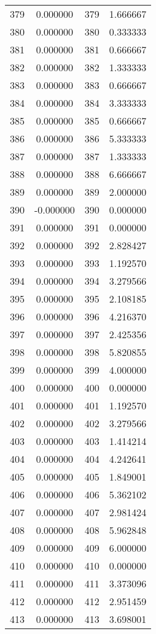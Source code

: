 \documentclass[12pt]{article}
\begin{document}
\begin{longtable}{@{}cccc@{}}
379 & 0.000000 & 379 & 1.666667 \\
380 & 0.000000 & 380 & 0.333333 \\
381 & 0.000000 & 381 & 0.666667 \\
382 & 0.000000 & 382 & 1.333333 \\
383 & 0.000000 & 383 & 0.666667 \\
384 & 0.000000 & 384 & 3.333333 \\
385 & 0.000000 & 385 & 0.666667 \\
386 & 0.000000 & 386 & 5.333333 \\
387 & 0.000000 & 387 & 1.333333 \\
388 & 0.000000 & 388 & 6.666667 \\
389 & 0.000000 & 389 & 2.000000 \\
390 & -0.000000 & 390 & 0.000000 \\
391 & 0.000000 & 391 & 0.000000 \\
392 & 0.000000 & 392 & 2.828427 \\
393 & 0.000000 & 393 & 1.192570 \\
394 & 0.000000 & 394 & 3.279566 \\
395 & 0.000000 & 395 & 2.108185 \\
396 & 0.000000 & 396 & 4.216370 \\
397 & 0.000000 & 397 & 2.425356 \\
398 & 0.000000 & 398 & 5.820855 \\
399 & 0.000000 & 399 & 4.000000 \\
400 & 0.000000 & 400 & 0.000000 \\
401 & 0.000000 & 401 & 1.192570 \\
402 & 0.000000 & 402 & 3.279566 \\
403 & 0.000000 & 403 & 1.414214 \\
404 & 0.000000 & 404 & 4.242641 \\
405 & 0.000000 & 405 & 1.849001 \\
406 & 0.000000 & 406 & 5.362102 \\
407 & 0.000000 & 407 & 2.981424 \\
408 & 0.000000 & 408 & 5.962848 \\
409 & 0.000000 & 409 & 6.000000 \\
410 & 0.000000 & 410 & 0.000000 \\
411 & 0.000000 & 411 & 3.373096 \\
412 & 0.000000 & 412 & 2.951459 \\
413 & 0.000000 & 413 & 3.698001 \\

\end{longtable}
\end{document}

